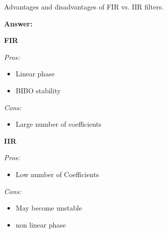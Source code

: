 \documentclass{article}
\begin{document}
\begin{enumerate}
  \begin{item}
    Advantages and disadvantages of FIR vs. IIR filters. 

  \textbf{Answer:}

    \textbf{FIR}

    \textit{Pros:}

    \begin{itemize}
      \item Linear phase
      \item BIBO stability
    \end{itemize}

    \textit{Cons:}

    \begin{itemize}
      \item Large number of coefficients
    \end{itemize}

    \textbf{IIR}

    \textit{Pros:}

    \begin{itemize}
      \item Low number of Coefficients
    \end{itemize}

    \textit{Cons:}

    \begin{itemize}
      \item May become unstable
      \item non linear phase
    \end{itemize}

  \end{item}

\end{enumerate}





\end{document}
